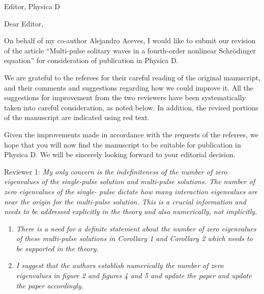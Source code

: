\documentclass[11pt]{letter}
\begin{document}
\address{Ross Parker \\
Department of Mathematics \\
Southern Methodist University \\
Dallas, TX 75275 \\
\texttt{rhparker@smu.edu}}%
\signature{Ross Parker}
\begin{letter}{Editor, Physica D}

\opening{Dear Editor,}

On behalf of my co-author Alejandro Aceves, I would like to submit our revision of the article ``Multi-pulse solitary waves in a fourth-order nonlinear {S}chr{\"o}dinger equation'' for consideration of publication in Physica D. 

We are grateful to the referees for their careful reading of the original manuscript, and their comments and suggestions regarding how we could improve it. All the suggestions for improvement from the two reviewers have been systematically taken into careful consideration, as noted below. In addition, the revised portions of the manuscript are indicated using red text.

Given the improvements made in accordance with the requests of the referees, we hope that you will now find the manuscript to be suitable for publication in Physica D. We will be sincerely looking forward to your editorial decision.

Reviewer 1: \emph{My only concern is the indefiniteness of the number of zero eigenvalues of the single-pulse solution and multi-pulse solutions. The number of zero eigenvalues of the single- pulse dictate how many interaction eigenvalues are near the origin for the multi-pulse solution. This is a crucial information and needs to be addressed explicitly in the theory and also numerically, not implicitly.}

\begin{enumerate}
\item \emph{There is a need for a definite statement about the number of zero eigenvalues of these multi-pulse solutions in Corollary 1 and Corollary 2 which needs to be supported in the theory.}
\vspace{4mm}

\item \emph{I suggest that the authors establish numerically the number of zero eigenvalues in figure 2 and figures 4 and 5 and update the paper and update the paper accordingly.}
\vspace{4mm}


\end{enumerate}
\end{letter}
\end{document}
